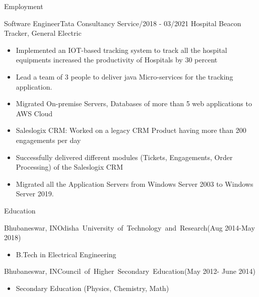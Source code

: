 \documentclass[]{mcdowellcv}
\begin{document}
\begin{cvsection}{Employment}
        \begin{cvsubsection}{Software Engineer}{Tata Consultancy Service}{/2018 - 03/2021}
            Hospital Beacon Tracker, General Electric
            \begin{itemize}
                \item Implemented an IOT-based tracking system to track all the hospital equipments increased the productivity of Hospitals by 30 percent
                \item Lead a team of 3 people to deliver java Micro-services for the tracking application.
                \item Migrated On-premise Servers, Databases of more than 5 web applications to AWS Cloud
                \item Saleslogix CRM: Worked on a legacy CRM Product having more than 200 engagements per day
                \item Successfully delivered different modules (Tickets, Engagements, Order Processing) of the Saleslogix CRM
                \item Migrated all the Application Servers from Windows Server 2003 to Windows Server 2019.
            \end{itemize}
        \end{cvsubsection}
    \end{cvsection}

    \begin{cvsection}{Education}
        \begin{cvsubsection}{Bhubaneswar, IN}{\mbox{Odisha University of Technology and Research}}{(Aug 2014-May 2018)}
            \begin{itemize}
                \item B.Tech in Electrical Engineering
            \end{itemize}
        \end{cvsubsection}
        \begin{cvsubsection}{Bhubaneswar, IN}{\mbox{Council of Higher Secondary Education}}{(May 2012- June 2014)}
            \begin{itemize}
                \item Secondary Education (Physics, Chemistry, Math)
            \end{itemize}
        \end{cvsubsection}
    \end{cvsection}
\end{document}
